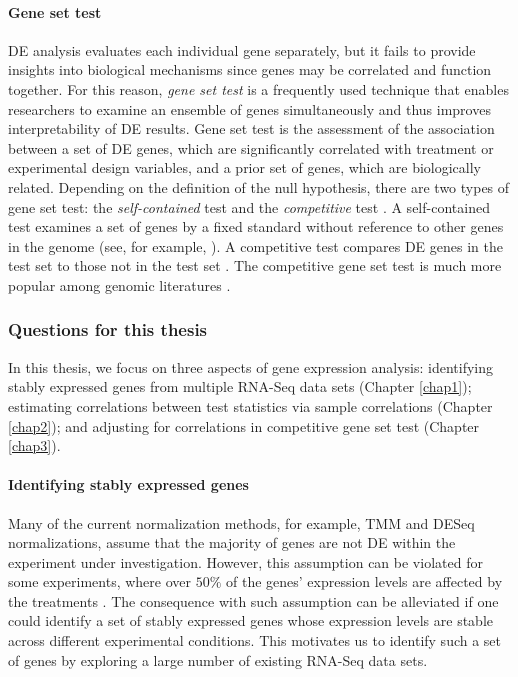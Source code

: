 \paragraph*{Gene set test}
DE analysis evaluates each individual gene separately, but it fails to provide insights into
biological mechanisms since genes may be correlated and function together. %
For this reason, \textit{gene set test} is a frequently used technique that enables
researchers to examine an ensemble of genes simultaneously and thus improves interpretability of DE
results. Gene set test is the assessment of
the association between a set of DE genes, which are significantly correlated with
treatment or experimental design variables, and a prior set of genes, which are biologically
related. Depending on the definition of the null hypothesis, there are two types of gene set test:
the \textit{self-contained} test and the \textit{competitive} test \citep{goeman2007analyzing}. A
self-contained test examines a set of genes by a fixed standard without reference to other genes in
the genome (see, for example, \cite{goeman2004global,goeman2005testing, huang2013gene,
	tsai2009multivariate, wu2010roast}). A competitive test compares DE
genes in the test set to those not in the test set
\citep{tian2005discovering,wu2012camera,yaari2013quantitative}. The competitive gene set test is
much more popular among genomic literatures \citep{gatti2010heading,goeman2007analyzing}.  




\subsubsection{Questions for this thesis}
In this thesis, we focus on three aspects of gene expression analysis: identifying stably
expressed genes from multiple RNA-Seq data sets (Chapter \ref{chap1}); estimating correlations
between test statistics via sample
correlations (Chapter \ref{chap2}); and adjusting for correlations in competitive gene set test
(Chapter \ref{chap3}).

\paragraph{Identifying stably expressed genes}
Many of the current normalization methods, for example, TMM \citep{robinson2010scaling} and DESeq
\citep{anders2010differential} normalizations, assume that the majority of genes are not DE within
the experiment under investigation. However, this assumption can be violated for some experiments,
where over $50\%$ of the genes' expression levels are affected by the treatments
\citep{loven2012revisiting, wu2013use}. The consequence with such assumption can be alleviated if
one could identify a set of stably expressed genes whose expression levels are stable across
different experimental conditions. This motivates us to identify such a set of genes by exploring a
large number of existing RNA-Seq data sets.

